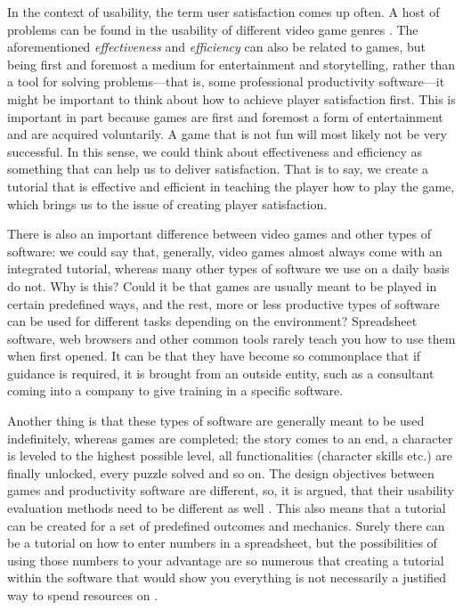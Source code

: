 In the context of usability, the term user satisfaction comes up often. A host of problems can be found in the usability of different video game genres \cite{Pinelle2008b}. The aforementioned \textit{effectiveness} and \textit{efficiency} can also be related to games, but being first and foremost a medium for entertainment and storytelling, rather than a tool for solving problems---that is, some professional productivity software---it might be important to think about how to achieve player satisfaction first. This is important in part because games are first and foremost a form of entertainment and are acquired voluntarily. A game that is not fun will most likely not be very successful. \cite{Federoff2002} In this sense, we could think about effectiveness and efficiency as something that can help us to deliver satisfaction. That is to say, we create a tutorial that is effective and efficient in teaching the player how to play the game, which brings us to the issue of creating player satisfaction.

There is also an important difference between video games and other types of software: we could say that, generally, video games almost always come with an integrated tutorial, whereas many other types of software we use on a daily basis do not. Why is this? Could it be that games are usually meant to be played in certain predefined ways, and the rest, more or less productive types of software can be used for different tasks depending on the environment? Spreadsheet software, web browsers and other common tools rarely teach you how to use them when first opened. It can be that they have become so commonplace that if guidance is required, it is brought from an outside entity, such as a consultant coming into a company to give training in a specific software. 

Another thing is that these types of software are generally meant to be used indefinitely, whereas games are completed; the story comes to an end, a character is leveled to the highest possible level, all functionalities (character skills etc.) are finally unlocked, every puzzle solved and so on. The design objectives between games and productivity software are different, so, it is argued, that their usability evaluation methods need to be different as well \cite{Korhonen2009}. This also means that a tutorial can be created for a set of predefined outcomes and mechanics. Surely there can be a tutorial on how to enter numbers in a spreadsheet, but the possibilities of using those numbers to your advantage are so numerous that creating a tutorial within the software that would show you everything is not necessarily a justified way to spend resources on \cite{Shane2013}.

